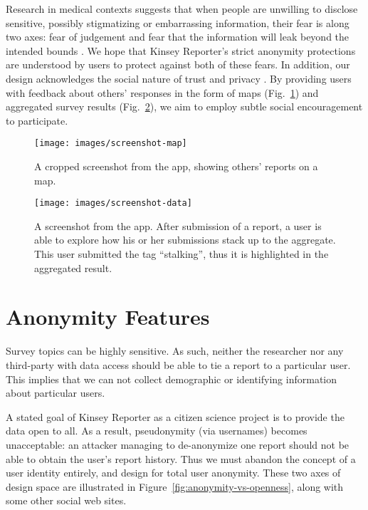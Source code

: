 \documentclass{sigchi}
\begin{document}
Research in medical contexts suggests that when people are unwilling to disclose sensitive, possibly stigmatizing or embarrassing information, their fear is along two axes: fear of judgement and fear that the information will leak beyond the intended bounds \cite{Stablein2012}. 
We hope that Kinsey Reporter's strict anonymity protections are understood by users to protect against both of these fears. In addition, our design acknowledges the social nature of trust and privacy \cite{Anthony2007, Benisch2011}. By providing users with feedback about others' responses in the form of maps (Fig.~\ref{fig:screenshot-map}) and aggregated survey results (Fig.~\ref{fig:screenshot-data}), we aim to employ subtle social encouragement to participate.

\begin{figure}
\texttt{[image: images/screenshot-map]}
 \caption{A cropped screenshot from the app, showing others' reports on a map.}
\label{fig:screenshot-map}
\end{figure}

\begin{figure}
\texttt{[image: images/screenshot-data]}
 \caption{A screenshot from the app. After submission of a report, a user is able to explore how his or her submissions stack up to the aggregate. This user submitted the tag ``stalking'', thus it is highlighted in the aggregated result.}
\label{fig:screenshot-data}
\end{figure}


\section{Anonymity Features}

Survey topics can be highly sensitive. As such, neither the researcher nor any third-party with data access should be able to tie a report to a particular user.
This implies that we can not collect demographic or identifying information about particular users.

A stated goal of Kinsey Reporter as a citizen science project is to provide the data open to all.
As a result, pseudonymity (via usernames) becomes unacceptable: an attacker managing to de-anonymize one report should not be able to obtain the user's report history.
Thus we must abandon the concept of a user identity entirely, and design for total user anonymity.
These two axes of design space are illustrated in Figure~\ref{fig:anonymity-vs-openness}, along with some other social web sites.
\end{document}

